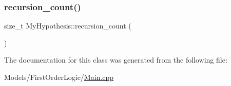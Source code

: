 \subsubsection{\texorpdfstring{recursion\+\_\+count()}{recursion\_count()}}
{\footnotesize\ttfamily size\+\_\+t My\+Hypothesis\+::recursion\+\_\+count (\begin{DoxyParamCaption}{ }\end{DoxyParamCaption})\hspace{0.3cm}{\ttfamily [inline]}}



The documentation for this class was generated from the following file\+:\begin{DoxyCompactItemize}
\item 
Models/\+First\+Order\+Logic/\hyperlink{_models_2_first_order_logic_2_main_8cpp}{Main.\+cpp}\end{DoxyCompactItemize}
